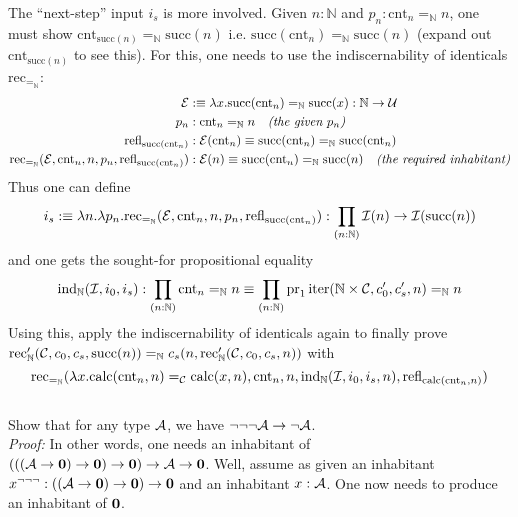 The ``next-step'' input $i_{s}$ is more involved. Given $n : \mathbb{N}$ and $p_{n} : \text{cnt}_{n} =_{\mathbb{N}} n$, one must show $\text{cnt}_{\text{succ}(n)} =_{\mathbb{N}} \text{succ}(n)$ i.e. $\text{succ}(\text{cnt}_{n}) =_{\mathbb{N}} \text{succ}(n)$ (expand out $\text{cnt}_{\text{succ}(n)}$ to see this). For this, one needs to use the indiscernability of identicals $\text{rec}_{=_{\mathbb{N}}}$:
\begin{align*}
	\mathcal{E} &:\equiv \lambda x.\text{succ}(\text{cnt}_{n}) =_{\mathbb{N}} \text{succ}(x) : \mathbb{N} \to \mathcal{U} \\
	p_{n} &: \text{cnt}_{n} =_{\mathbb{N}} n \quad \textit{(the given $p_{n}$)} \\
	\text{refl}_{\text{succ}(\text{cnt}_{n})} &: \mathcal{E}(\text{cnt}_{n}) \equiv \text{succ}(\text{cnt}_{n}) =_{\mathbb{N}} \text{succ}(\text{cnt}_{n}) \\
	\text{rec}_{=_{\mathbb{N}}}(\mathcal{E}, \text{cnt}_{n}, n, p_{n}, \text{refl}_{\text{succ}(\text{cnt}_{n})}) &: \mathcal{E}(n) \equiv \text{succ}(\text{cnt}_{n}) =_{\mathbb{N}} \text{succ}(n) \quad \textit{(the required inhabitant)}
\end{align*}
Thus one can define
\[
	i_{s} :\equiv \lambda n. \lambda p_{n}. \text{rec}_{=_{\mathbb{N}}}(\mathcal{E}, \text{cnt}_{n}, n, p_{n}, \text{refl}_{\text{succ}(\text{cnt}_{n})}) : \prod_{(n : \mathbb{N})} \mathcal{I}(n) \to \mathcal{I}(\text{succ}(n))
\]
and one gets the sought-for propositional equality
\[
	\text{ind}_{\mathbb{N}}(\mathcal{I}, i_{0}, i_{s}) : \prod_{(n : \mathbb{N})} \text{cnt}_{n} =_{\mathbb{N}} n \equiv \prod_{(n : \mathbb{N})}\text{pr}_{1}\,\text{iter}(\mathbb{N} \times \mathcal{C}, c'_{0}, c'_{s}, n) =_{\mathbb{N}} n
\]
Using this, apply the indiscernability of identicals again to finally prove $\text{rec}'_{\mathbb{N}}(\mathcal{C}, c_{0}, c_{s}, \text{succ}(n)) =_{\mathbb{N}} c_{s}(n,\text{rec}'_{\mathbb{N}}(\mathcal{C}, c_{0}, c_{s}, n))$ with
\[
	\text{rec}_{=_{\mathbb{N}}}(\lambda x. \text{calc}(\text{cnt}_{n},n) =_{\mathcal{C}} \text{calc}(x,n), \text{cnt}_{n}, n, \text{ind}_{\mathbb{N}}(\mathcal{I}, i_{0}, i_{s}, n), \text{refl}_{\text{calc}(\text{cnt}_{n},n)})
\] \\



 Show that for any type $\mathcal{A}$, we have $\neg\neg\neg \mathcal{A} \to \neg \mathcal{A}$. \\


\textit{Proof:} In other words, one needs an inhabitant of $(((\mathcal{A} \to \textbf{0}) \to \textbf{0}) \to \textbf{0}) \to \mathcal{A} \to \textbf{0}$. Well, assume as given an inhabitant $x^{\neg\neg\neg} : ((\mathcal{A} \to \textbf{0}) \to \textbf{0}) \to \textbf{0}$ and an inhabitant $x : \mathcal{A}$. One now needs to produce an inhabitant of $\textbf{0}$.


